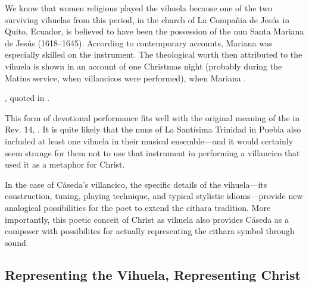 We know that women religious played the vihuela because one of the two
surviving vihuelas from this period, in the church of La Compañia de Jesús in
Quito, Ecuador, is believed to have been the possession of the nun Santa
Mariana de Jesús (1618--1645).
According to contemporary accounts, Mariana was especially skilled on the
instrument. 
The theological worth then attributed to the vihuela is shown in an account of
one Christmas night (probably during the Matins service, when villancicos were
performed), when Mariana .%
\begin{Footnote}
    \Autocite[275]{EspinosaPolit:SantaMariana}, quoted in
    \Autocite[73]{Bermudez:Vihuela}.
\end{Footnote}
This form of devotional performance fits well with the original meaning of the
 in Rev. 14, .%
    \Autocite{BDAG}
It is quite likely that the nuns of La Santísima Trinidad in Puebla also
included at least one vihuela in their musical ensemble---and it would
certainly seem strange for them not to use that instrument in performing a
villancico that used it as a metaphor for Christ.

In the case of Cáseda's villancico, the specific details of the vihuela---its
construction, tuning, playing technique, and typical stylistic idioms---provide
new analogical possibilities for the poet to extend the cithara tradition.
More importantly, this poetic conceit of Christ as vihuela also provides Cáseda
as a composer with possibilites for actually representing the cithara symbol
through sound.

\subsection{Representing the Vihuela, Representing Christ}

